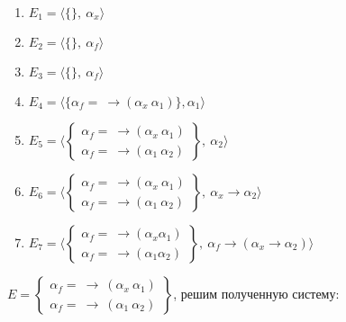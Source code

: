 \begin{enumerate}
	\item $E_1=\big \langle \{\},\:\alpha_x \big \rangle$
	\item $E_2=\big \langle \{\},\:\alpha_f \big \rangle$
	\item $E_3=\big \langle \{\},\:\alpha_f \big \rangle$
	\item $E_4=\big \langle \{\alpha_f=\:\rightarrow(\alpha_x\:\alpha_1)\}, \alpha_1 \big \rangle$
	\item $E_5=\big \langle \begin{Bmatrix}
	\alpha_f=\:\rightarrow(\alpha_x\:\alpha_1)\\
	\alpha_f=\:\rightarrow(\alpha_1\:\alpha_2)
\end{Bmatrix},\:\alpha_2 \big \rangle$
	\item $E_6=\big \langle \begin{Bmatrix}\alpha_f=\:\rightarrow(\alpha_x\:\alpha_1)\\ \alpha_f=\:\rightarrow(\alpha_1\:\alpha_2)\end{Bmatrix},\:\alpha_x\rightarrow\alpha_2 \big \rangle$
	\item $E_7=\big \langle \begin{Bmatrix}\alpha_f=\:\rightarrow(\alpha_x\alpha_1)\\ \alpha_f=\:\rightarrow(\alpha_1\alpha_2)\end{Bmatrix},\:\alpha_f\rightarrow(\alpha_x\rightarrow\alpha_2) \big \rangle$
\end{enumerate}
	$E=\begin{Bmatrix}\alpha_f=\:\rightarrow\:(\alpha_x\:\alpha_1)\\ \alpha_f=\:\rightarrow\:(\alpha_1\:\alpha_2)\end{Bmatrix}$, решим полученную систему:\par 
